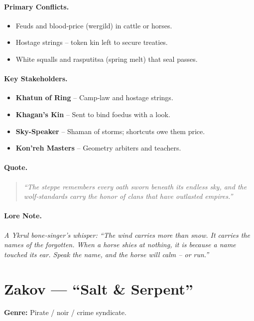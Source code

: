 \paragraph{Primary Conflicts.}
\begin{itemize}
  \item Feuds and blood‑price (wergild) in cattle or horses.
  \item Hostage strings – token kin left to secure treaties.
  \item White squalls and rasputitsa (spring melt) that seal passes.
\end{itemize}

\paragraph{Key Stakeholders.}
\begin{itemize}
  \item \textbf{Khatun of Ring} – Camp‑law and hostage strings.
  \item \textbf{Khagan’s Kin} – Sent to bind foedus with a look.
  \item \textbf{Sky-Speaker} – Shaman of storms; shortcuts owe them price.
  \item \textbf{Kon'reh Masters} – Geometry arbiters and teachers.
\end{itemize}

\paragraph{Quote.}
\begin{quote}
\emph{“The steppe remembers every oath sworn beneath its endless sky, and the wolf‑standards carry the honor of clans that have outlasted empires.”}
\end{quote}

\paragraph{Lore Note.}
\emph{A Ykrul bone‑singer’s whisper: “The wind carries more than snow. It carries the names of the forgotten. When a horse shies at nothing, it is because a name touched its ear. Speak the name, and the horse will calm – or run.”}

\section{Zakov — “Salt \& Serpent”}
\textbf{Genre:} Pirate / noir / crime syndicate.

